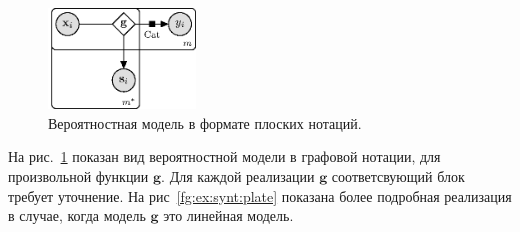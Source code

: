\begin{figure}[h!t]\center
\includegraphics[width=0.35\textwidth]{results/privlearn/general_model}
\caption{Вероятностная модель в формате плоских нотаций.}
\label{fg:st:plate}
\end{figure}

На рис.~\ref{fg:st:plate} показан вид вероятностной модели в графовой нотации, для произвольной функции $\mathbf{g}$. Для каждой реализации $\mathbf{g}$ соответсвующий блок требует уточнение. На рис~\ref{fg:ex:synt:plate} показана более подробная реализация в случае, когда модель $\mathbf{g}$ это линейная модель.

